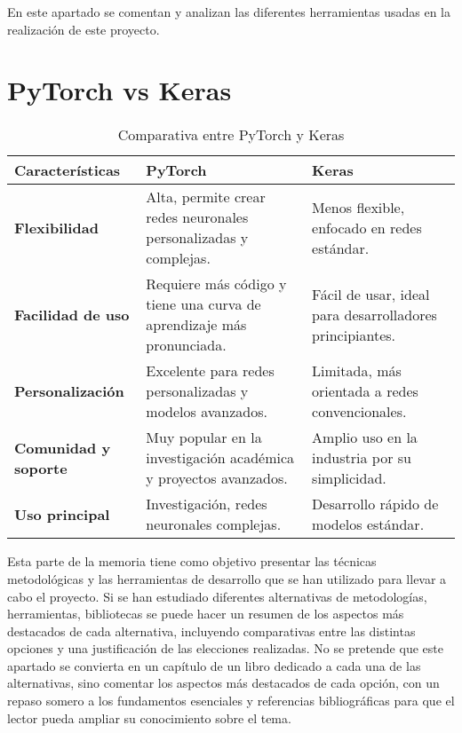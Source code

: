 
En este apartado se comentan y analizan las diferentes herramientas usadas en la realización de este proyecto.

\section{PyTorch vs Keras}


\begin{table}[!ht]
	\raggedleft
	\begin{tabular}{|l|l|l|}
		\hline
		\textbf{Características} & \textbf{PyTorch} & \textbf{Keras} \\ \hline
		\textbf{Flexibilidad} & Alta, permite crear redes neuronales personalizadas y complejas. & Menos flexible, enfocado en redes estándar. \\ \hline
		\textbf{Facilidad de uso} & Requiere más código y tiene una curva de aprendizaje más pronunciada. & Fácil de usar, ideal para desarrolladores principiantes. \\ \hline
		\textbf{Personalización} & Excelente para redes personalizadas y modelos avanzados. & Limitada, más orientada a redes convencionales. \\ \hline
		\textbf{Comunidad y soporte} & Muy popular en la investigación académica y proyectos avanzados. & Amplio uso en la industria por su simplicidad. \\ \hline
		\textbf{Uso principal} & Investigación, redes neuronales complejas. & Desarrollo rápido de modelos estándar. \\ \hline
	\end{tabular}
	\caption{Comparativa entre PyTorch y Keras}
\end{table}


Esta parte de la memoria tiene como objetivo presentar las técnicas metodológicas y las herramientas de desarrollo que se han utilizado para llevar a cabo el proyecto. Si se han estudiado diferentes alternativas de metodologías, herramientas, bibliotecas se puede hacer un resumen de los aspectos más destacados de cada alternativa, incluyendo comparativas entre las distintas opciones y una justificación de las elecciones realizadas. 
No se pretende que este apartado se convierta en un capítulo de un libro dedicado a cada una de las alternativas, sino comentar los aspectos más destacados de cada opción, con un repaso somero a los fundamentos esenciales y referencias bibliográficas para que el lector pueda ampliar su conocimiento sobre el tema.


